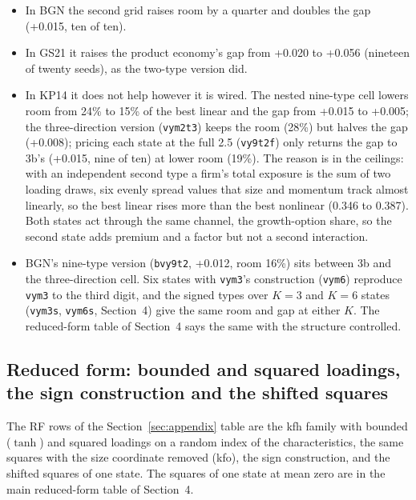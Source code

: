 \documentclass[11pt]{article}
\begin{document}
\begin{itemize}
\item In BGN the second grid raises room by a quarter and doubles the gap (+0.015, ten of ten).
\item In GS21 it raises the product economy's gap from +0.020 to +0.056 (nineteen of twenty seeds), as the two-type version did.
\item In KP14 it does not help however it is wired. The nested nine-type cell lowers room from 24\% to 15\% of the best linear and the gap from +0.015 to +0.005; the three-direction version (\texttt{vym2t3}) keeps the room (28\%) but halves the gap (+0.008); pricing each state at the full 2.5 (\texttt{vy9t2f}) only returns the gap to 3b's (+0.015, nine of ten) at lower room (19\%). The reason is in the ceilings: with an independent second type a firm's total exposure is the sum of two loading draws, six evenly spread values that size and momentum track almost linearly, so the best linear rises more than the best nonlinear (0.346 to 0.387). Both states act through the same channel, the growth-option share, so the second state adds premium and a factor but not a second interaction.
\item BGN's nine-type version (\texttt{bvy9t2}, +0.012, room 16\%) sits between 3b and the three-direction cell. Six states with \texttt{vym3}'s construction (\texttt{vym6}) reproduce \texttt{vym3} to the third digit, and the signed types over $K = 3$ and $K = 6$ states (\texttt{vym3s}, \texttt{vym6s}, Section~4) give the same room and gap at either $K$. The reduced-form table of Section~4 says the same with the structure controlled.
\end{itemize}
\subsection*{Reduced form: bounded and squared loadings, the sign construction and the shifted squares}

The RF rows of the Section~\ref{sec:appendix} table are the kfh family with bounded ($\tanh$) and squared loadings on a random index of the characteristics, the same squares with the size coordinate removed (kfo), the sign construction, and the shifted squares of one state. The squares of one state at mean zero are in the main reduced-form table of Section~4.
\end{document}
